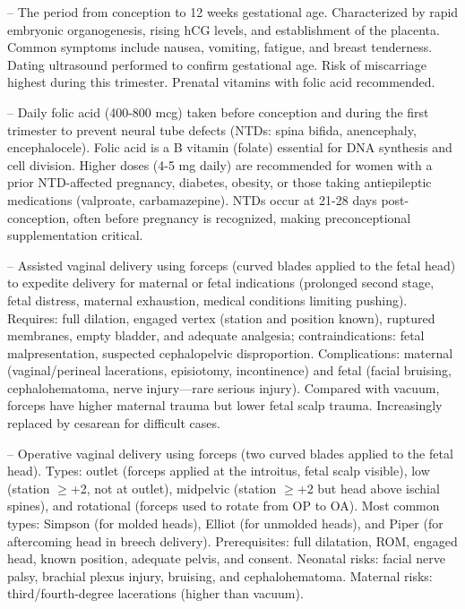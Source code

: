 -- The period from conception to 12 weeks gestational age. Characterized by rapid embryonic organogenesis, rising hCG levels, and establishment of the placenta. Common symptoms include nausea, vomiting, fatigue, and breast tenderness. Dating ultrasound performed to confirm gestational age. Risk of miscarriage highest during this trimester. Prenatal vitamins with folic acid recommended.

-- Daily folic acid (400-800 mcg) taken before conception and during the first trimester to prevent neural tube defects (NTDs: spina bifida, anencephaly, encephalocele). Folic acid is a B vitamin (folate) essential for DNA synthesis and cell division. Higher doses (4-5 mg daily) are recommended for women with a prior NTD-affected pregnancy, diabetes, obesity, or those taking antiepileptic medications (valproate, carbamazepine). NTDs occur at 21-28 days post-conception, often before pregnancy is recognized, making preconceptional supplementation critical.

-- Assisted vaginal delivery using forceps (curved blades applied to the fetal head) to expedite delivery for maternal or fetal indications (prolonged second stage, fetal distress, maternal exhaustion, medical conditions limiting pushing). Requires: full dilation, engaged vertex (station and position known), ruptured membranes, empty bladder, and adequate analgesia; contraindications: fetal malpresentation, suspected cephalopelvic disproportion. Complications: maternal (vaginal/perineal lacerations, episiotomy, incontinence) and fetal (facial bruising, cephalohematoma, nerve injury—rare serious injury). Compared with vacuum, forceps have higher maternal trauma but lower fetal scalp trauma. Increasingly replaced by cesarean for difficult cases.

-- Operative vaginal delivery using forceps (two curved blades applied to the fetal head). Types: outlet (forceps applied at the introitus, fetal scalp visible), low (station \(\ge\)+2, not at outlet), midpelvic (station \(\ge\)+2 but head above ischial spines), and rotational (forceps used to rotate from OP to OA). Most common types: Simpson (for molded heads), Elliot (for unmolded heads), and Piper (for aftercoming head in breech delivery). Prerequisites: full dilatation, ROM, engaged head, known position, adequate pelvis, and consent. Neonatal risks: facial nerve palsy, brachial plexus injury, bruising, and cephalohematoma. Maternal risks: third/fourth-degree lacerations (higher than vacuum).

